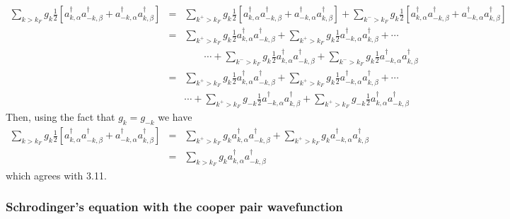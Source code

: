 \documentclass{article}
\begin{document}
\begin{flushleft}
\begin{eqnarray*}
\sum_{k>k_{F}}g_{k}\frac{1}{2}\left[a_{k,\alpha}^{\dagger}a_{-k,\beta}^{\dagger}+a_{-k,\alpha}^{\dagger}a_{k,\beta}^{\dagger}\right] & = & \sum_{k^{+}>k_{F}}g_{k}\frac{1}{2}\left[a_{k,\alpha}^{\dagger}a_{-k,\beta}^{\dagger}+a_{-k,\alpha}^{\dagger}a_{k,\beta}^{\dagger}\right]+\sum_{k^{-}>k_{F}}g_{k}\frac{1}{2}\left[a_{k,\alpha}^{\dagger}a_{-k,\beta}^{\dagger}+a_{-k,\alpha}^{\dagger}a_{k,\beta}^{\dagger}\right]\\
 & = & \sum_{k^{+}>k_{F}}g_{k}\frac{1}{2}a_{k,\alpha}^{\dagger}a_{-k,\beta}^{\dagger}+\sum_{k^{+}>k_{F}}g_{k}\frac{1}{2}a_{-k,\alpha}^{\dagger}a_{k,\beta}^{\dagger}+\cdots\\
 &  & \qquad\cdots+\sum_{k^{-}>k_{F}}g_{k}\frac{1}{2}a_{k,\alpha}^{\dagger}a_{-k,\beta}^{\dagger}+\sum_{k^{-}>k_{F}}g_{k}\frac{1}{2}a_{-k,\alpha}^{\dagger}a_{k,\beta}^{\dagger}\\
 & = & \sum_{k^{+}>k_{F}}g_{k}\frac{1}{2}a_{k,\alpha}^{\dagger}a_{-k,\beta}^{\dagger}+\sum_{k^{+}>k_{F}}g_{k}\frac{1}{2}a_{-k,\alpha}^{\dagger}a_{k,\beta}^{\dagger}+\cdots\\
 &  & \cdots+\sum_{k^{+}>k_{F}}g_{-k}\frac{1}{2}a_{-k,\alpha}^{\dagger}a_{k,\beta}^{\dagger}+\sum_{k^{+}>k_{F}}g_{-k}\frac{1}{2}a_{k,\alpha}^{\dagger}a_{-k,\beta}^{\dagger}\end{eqnarray*}
 Then, using the fact that $g_{k}=g_{-k}$ we have\begin{eqnarray*}
\sum_{k>k_{F}}g_{k}\frac{1}{2}\left[a_{k,\alpha}^{\dagger}a_{-k,\beta}^{\dagger}+a_{-k,\alpha}^{\dagger}a_{k,\beta}^{\dagger}\right] & = & \sum_{k^{+}>k_{F}}g_{k}a_{k,\alpha}^{\dagger}a_{-k,\beta}^{\dagger}+\sum_{k^{+}>k_{F}}g_{k}a_{-k,\alpha}^{\dagger}a_{k,\beta}^{\dagger}\\
 & = & \sum_{k>k_{F}}g_{k}a_{k,\alpha}^{\dagger}a_{-k,\beta}^{\dagger}\end{eqnarray*}
 which agrees with 3.11.
\par\end{flushleft}


\subsubsection*{Schrodinger's equation with the cooper pair wavefunction}
\end{document}
